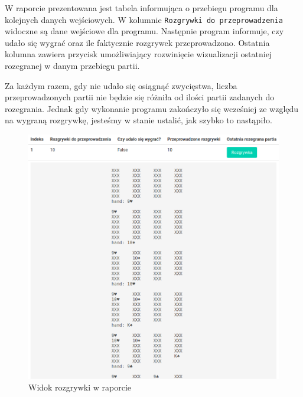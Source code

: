 \documentclass[12pt,a4paper]{article}
\begin{document}
W raporcie prezentowana jest tabela informująca o przebiegu programu dla kolejnych danych wejściowych. W kolumnie \texttt{Rozgrywki do przeprowadzenia} widoczne są dane wejściowe dla programu. Następnie program informuje, czy udało się wygrać oraz ile faktycznie rozgrywek przeprowadzono. Ostatnia kolumna zawiera przycisk umożliwiający rozwinięcie wizualizacji ostatniej rozegranej w danym przebiegu partii.

Za każdym razem, gdy nie udało się osiągnąć zwycięstwa, liczba przeprowadzonych partii nie będzie się różniła od ilości partii zadanych do rozegrania. Jednak gdy wykonanie programu zakończyło się wcześniej ze względu na wygraną rozgrywkę, jesteśmy w stanie ustalić, jak szybko to nastąpiło.

\begin{figure}
    \centering
    \includegraphics[width=0.75\linewidth]{raport-rozgrywka.png}
    \caption{Widok rozgrywki w raporcie}
    \label{fig:report-game}
\end{figure}
\end{document}
